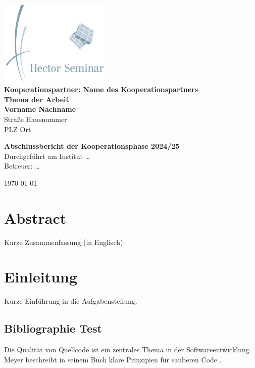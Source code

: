 \documentclass[12pt,a4paper]{article}
\begin{document}
	
	\begin{titlepage}
		\centering
		\includegraphics[width=0.4\textwidth]{logo.png} \\[1cm] %
		\textbf{\LARGE{Kooperationspartner: Name des Kooperationspartners}} \\[2cm]
		{\Large \textbf{Thema der Arbeit}} \\[2cm]
		
		\vfill
		\textbf{Vorname Nachname} \\
		Straße Hausnummer \\
		PLZ Ort \\
		\vfill
		
		\textbf{Abschlussbericht der Kooperationsphase 2024/25} \\
		Durchgeführt am Institut … \\
		Betreuer: … \\
		\vfill
		
		\today
	\end{titlepage}
	
	\tableofcontents
	\newpage
	
	\section*{Abstract}
	Kurze Zusammenfassung (in Englisch). \\
	
	\section{Einleitung}
	Kurze Einführung in die Aufgabenstellung.
	
	\subsection{Bibliographie Test}
	
	Die Qualität von Quellcode ist ein zentrales Thema in der Softwareentwicklung. Meyer beschreibt in seinem Buch klare Prinzipien für sauberen Code \cite{meyer2008clean}. 
	
\end{document}

